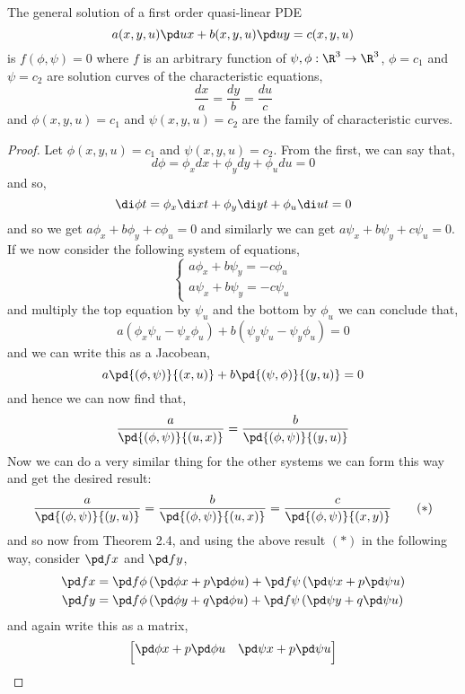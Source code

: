 \begin{nthm}
  The general solution of a first order quasi-linear PDE
  $$ a(x, y, u)\pd u x + b(x, y, u)\pd u y = c(x, y, u) $$
  is $f(\phi, \psi) = 0$ where $f$ is an arbitrary function of $\psi, \phi : \R^3 \to \R^3$, $\phi = c_1$ and $\psi = c_2$ are solution curves of the characteristic equations,
  $$ \frac{dx}{a} = \frac{dy}{b} = \frac{du}{c} $$
  and $\phi(x, y, u) = c_1$ and $\psi(x, y, u) = c_2$ are the family of characteristic curves.
\end{nthm}
\begin{proof}
  Let $\phi(x, y, u) = c_1$ and $\psi(x, y, u) = c_2$. From the first, we can say that,
  $$ d\phi = \phi_x dx + \phi_ydy + \phi_udu = 0 $$
  and so,
  $$ \di \phi t = \phi_x \di x t + \phi_y \di y t + \phi_u\di u t = 0 $$
  and so we get $a\phi_x + b\phi_y + c\phi_u = 0$ and similarly we can get $a\psi_x + b\psi_y + c\psi_u = 0$. If we now consider the following system of equations,
  $$ \begin{cases}
    a\phi_x + b\psi_y = -c\phi_u \\
    a\psi_x + b\psi_y = -c\psi_u
  \end{cases} $$
  and multiply the top equation by $\psi_u$ and the bottom by $\phi_u$ we can conclude that,
  $$ a(\phi_x\psi_u - \psi_x\phi_u) + b(\psi_y\psi_u - \psi_y\phi_u) = 0 $$
  and we can write this as a Jacobean,
  $$ a\pd{(\phi, \psi)}{(x, u)} + b\pd{(\psi, \phi)}{(y, u)} = 0 $$
  and hence we can now find that,
  $$ \frac{a}{\pd{(\phi, \psi)}{(u, x)}} = \frac{b}{\pd{(\phi, \psi)}{(y, u)}} $$
  Now we can do a very similar thing for the other systems we can form this way and get the desired result:
  \begin{equation}
    \frac{a}{\pd{(\phi, \psi)}{(y, u)}} = \frac{b}{\pd{(\phi, \psi)}{(u, x)}} = \frac{c}{\pd{(\phi, \psi)}{(x, y)}} \tag{$*$}
  \end{equation}
  and so now from Theorem 2.4, and using the above result $(*)$ in the following way, consider $\pd f x$ and $\pd f y$,
  \begin{align*}
    \pd f x &= \pd f \phi\left( \pd \phi x + p\pd \phi u \right) + \pd f \psi \left( \pd \psi x + p\pd \psi u \right)\\
    \pd f y &= \pd f \phi\left( \pd \phi y + q\pd \phi u \right) + \pd f \psi \left( \pd \psi y + q\pd \psi u \right)\\
  \end{align*}
  and again write this as a matrix,
  $$ \begin{bmatrix}
    \pd \phi x + p\pd \phi u & \pd \psi x + p\pd \psi u\\[5pt]

\end{bmatrix}$$
\end{proof}
